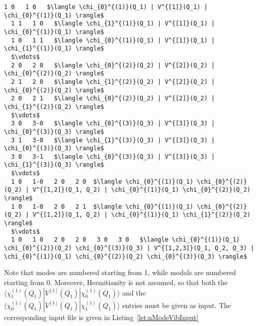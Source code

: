 \documentclass[bibliography=totoc,12pt,a4paper]{scrartcl}
\begin{document}
\begin{lstlisting}[language=qcmaquis,caption={Example of an vDMRG integral file for the potential
											  expressed in the $n$-mode format.},
				   label=lst:vibdump, mathescape=true]
  1 0   1 0   $\langle \chi_{0}^{(1)}(Q_1) | V^{[1]}(Q_1) | \chi_{0}^{(1)}(Q_1) \rangle$
  1 1   1 0   $\langle \chi_{1}^{(1)}(Q_1) | V^{[1]}(Q_1) | \chi_{0}^{(1)}(Q_1) \rangle$
  1 0   1 1   $\langle \chi_{0}^{(1)}(Q_1) | V^{[1]}(Q_1) | \chi_{1}^{(1)}(Q_1) \rangle$
  $\vdots$
  2 0   2 0   $\langle \chi_{0}^{(2)}(Q_2) | V^{[2]}(Q_2) | \chi_{0}^{(2)}(Q_2) \rangle$
  2 1   2 0   $\langle \chi_{1}^{(2)}(Q_2) | V^{[2]}(Q_2) | \chi_{0}^{(2)}(Q_2) \rangle$
  2 0   2 1   $\langle \chi_{0}^{(2)}(Q_2) | V^{[2]}(Q_2) | \chi_{1}^{(2)}(Q_2) \rangle$
  $\vdots$
  3 0   3-0   $\langle \chi_{0}^{(3)}(Q_3) | V^{[3]}(Q_3) | \chi_{0}^{(3)}(Q_3) \rangle$
  3 1   3-0   $\langle \chi_{1}^{(3)}(Q_3) | V^{[3]}(Q_3) | \chi_{0}^{(3)}(Q_3) \rangle$
  3 0   3-1   $\langle \chi_{0}^{(3)}(Q_3) | V^{[3]}(Q_3) | \chi_{1}^{(3)}(Q_3) \rangle$ 
  $\vdots$
  1 0   1-0   2 0   2 0  $\langle \chi_{0}^{(1)}(Q_1) \chi_{0}^{(2)}(Q_2) | V^{[1,2]}(Q_1, Q_2) | \chi_{0}^{(1)}(Q_1) \chi_{0}^{(2)}(Q_2) \rangle$
  1 0   1-0   2 0   2 1  $\langle \chi_{0}^{(1)}(Q_1) \chi_{0}^{(2)}(Q_2) | V^{[1,2]}(Q_1, Q_2) | \chi_{0}^{(1)}(Q_1) \chi_{1}^{(2)}(Q_2) \rangle$
  $\vdots$
  1 0   1 0   2 0   2 0   3 0   3 0   $\langle \chi_{0}^{(1)}(Q_1) \chi_{0}^{(2)}(Q_2) \chi_{0}^{(3)}(Q_3) | V^{[1,2,3]}(Q_1, Q_2, Q_3) | \chi_{0}^{(1)}(Q_1) \chi_{0}^{(2)}(Q_2) \chi_{0}^{(3)}(Q_3) \rangle$
\end{lstlisting}

Note that modes are numbered starting from 1, while modals are numbered starting from 0.
Moreover, Hermitianity is not assumed, so that both the $\langle \chi_{1}^{(1)}(Q_1) | V^{[1]}(Q_1) | \chi_{0}^{(1)}(Q_1) \rangle$ and the $\langle \chi_{0}^{(1)}(Q_1) | V^{[1]}(Q_1) | \chi_{1}^{(1)}(Q_1) \rangle$ entries must be given as input.
The corresponding input file is given in Listing~\ref{lst:nModeVibInput}
\end{document}
